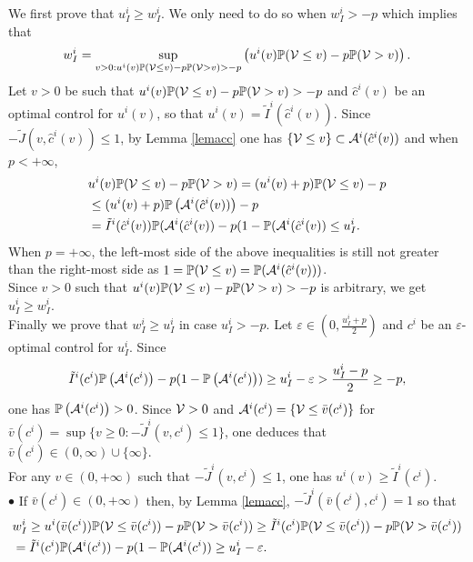 \documentclass{svjour3}
\begin{document}
\noindent 
We first prove that $u^i_I\geq w^i_I$. We only need to do so when $w^i_I>-p$ which implies that 
$$w^i_I=\sup_{v>0:u^i(v){\mathbb{P}}({\cal V}\leq v)-p{\mathbb{P}}({\cal V}> v)>-p}\left(u^i(v){\mathbb{P}}({\cal V}\leq v)-p{\mathbb{P}}({\cal V}>v)\right).$$ 
Let $v>0$ be such that $u^i(v){\mathbb{P}}({\cal V}\leq v)-p{\mathbb{P}}({\cal V}> v)>-p$ and $\hat c^i(v)$ be an optimal control for $u^i(v)$, so that $u^i(v)=\tilde I^i(\hat c^i(v))$. 
Since $-\tilde J(v,\hat c^i(v))\leq 1$, by Lemma \ref{lemacc} one has $\{{\cal V}\leq v\}\subset {\cal A}^i(\hat c^i(v))$ and when $p<+\infty$,
\begin{eqnarray*}
&u^i(v){\mathbb{P}}({\cal V}\leq v)-p{\mathbb{P}}({\cal V}>v)=(u^i(v)+p){\mathbb{P}}({\cal V}\leq v)-p
\\&\leq (u^i(v)+p){\mathbb{P}}\left({\cal A}^i(\hat c^i(v))\right)-p
\\
 &=\tilde I^i(\hat c^i(v)){\mathbb{P}}({\cal A}^i(\hat c^i(v))-p(1-{\mathbb{P}}({\cal A}^i(\hat c^i(v))\leq u^i_I.
\end{eqnarray*}
When $p=+\infty$, the left-most side of the above inequalities is still not greater than the right-most side as $1={\mathbb{P}}({\cal V}\leq v)={\mathbb{P}}({\cal A}^i(\hat c^i(v)))$.
\\
Since $v>0$ such that $u^i(v){\mathbb{P}}({\cal V}\leq v)-p{\mathbb{P}}({\cal V}>v)>-p$ is arbitrary, we get $u^i_I\geq w^i_I$.\\
Finally we prove that $w^i_I\geq u^i_I$ in case $u^i_I>-p$. Let ${\varepsilon}\in(0,\frac{u^i_I+p}{2})$ and $c^i$ be an ${\varepsilon}$-optimal control for $u^i_I$. Since $$\tilde I^i(c^i){\mathbb{P}}\left({\cal A}^i(c^i)\right)-p(1-{\mathbb{P}}\left({\cal A}^i(c^i)\right))\geq u^i_I-{\varepsilon}>\frac{u^i_I-p}{2}\geq-p,$$ 
one has ${\mathbb{P}}\left({\cal A}^i(c^i)\right)>0$. Since ${\cal V}>0$
 and ${\cal A}^i(c^i)=\{{\cal V}\leq \bar v(c^i)\}$ for $\bar v(c^i)=\sup\{v\geq 0:- \tilde J^i(v,c^i)\leq 1\}$, one deduces that $\bar v(c^i)\in(0,\infty)\cup\{\infty\}$.\\
For any $v\in (0,+\infty)$ such that $- \tilde J^i(v,c^i)\leq 1$, one has $u^i(v)\geq \tilde I^i(c^i)$. 
\\
$\bullet$ If $\bar v(c^i)\in (0,+\infty)$ then, by Lemma \ref{lemacc}, $- \tilde J^i(\bar v(c^i),c^i)=1$ so that
\begin{eqnarray*}
  & w^i_I\geq u^i(\bar v(c^i)){\mathbb{P}}({\cal V}\leq \bar v(c^i))-p{\mathbb{P}}({\cal V}>\bar v(c^i))\geq \tilde I^i(c^i){\mathbb{P}}({\cal V}\leq \bar v(c^i))-p{\mathbb{P}}({\cal V}>\bar v(c^i))
   \\
   &=\tilde I^i(c^i){\mathbb{P}}({\cal A}^i(c^i))-p(1-{\mathbb{P}}({\cal A}^i(c^i))\geq u^i_I-{\varepsilon}.
\end{eqnarray*}
\end{document}
